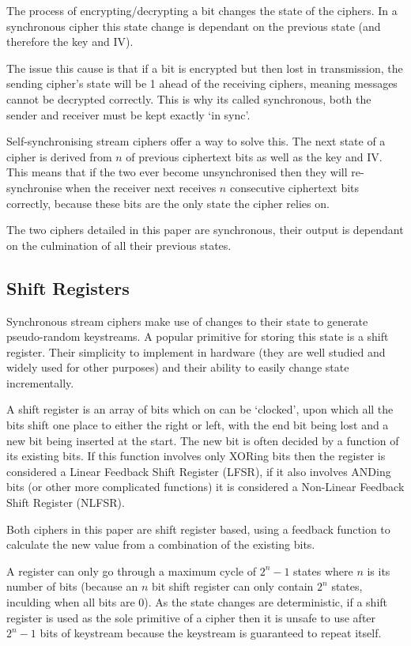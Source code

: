 \documentclass{report}
\let\Oldsubsection\subsection
\renewcommand{\subsection}{\FloatBarrier\Oldsubsection}
\begin{document}
The process of encrypting/decrypting a bit changes the state of the ciphers. In a synchronous cipher this state change is dependant on the previous state (and therefore the key and IV).

The issue this cause is that if a bit is encrypted but then lost in transmission, the sending cipher's state will be 1 ahead of the receiving ciphers, meaning messages cannot be decrypted correctly. This is why its called synchronous, both the sender and receiver must be kept exactly `in sync'.

Self-synchronising stream ciphers offer a way to solve this. The next state of a cipher is derived from $n$ of previous ciphertext bits as well as the key and IV. This means that if the two ever become unsynchronised then they will re-synchronise when the receiver next receives $n$ consecutive ciphertext bits correctly, because these bits are the only state the cipher relies on.

The two ciphers detailed in this paper are synchronous, their output is dependant on the culmination of all their previous states.

\subsection*{Shift Registers}
Synchronous stream ciphers make use of changes to their state to generate pseudo-random keystreams. A popular primitive for storing this state is a shift register. Their simplicity to implement in hardware (they are well studied and widely used for other purposes\cite{shiftregistersHardware}) and their ability to easily change state incrementally.

A shift register is an array of bits which on can be `clocked', upon which all the bits shift one place to either the right or left, with the end bit being lost and a new bit being inserted at the start. The new bit is often decided by a function of its existing bits. If this function involves only XORing bits then the register is considered a Linear Feedback Shift Register (LFSR), if it also involves ANDing bits (or other more complicated functions) it is considered a Non-Linear Feedback Shift Register (NLFSR).

Both ciphers in this paper are shift register based, using a feedback function to calculate the new value from a combination of the existing bits.

A register can only go through a maximum cycle of $2^n-1$ states where $n$ is its number of bits (because an $n$ bit shift register can only contain $2^n$ states, inculding when all bits are 0). As the state changes are deterministic, if a shift register is used as the sole primitive of a cipher then it is unsafe to use after $2^n-1$ bits of keystream because the keystream is guaranteed to repeat itself.
\end{document}
